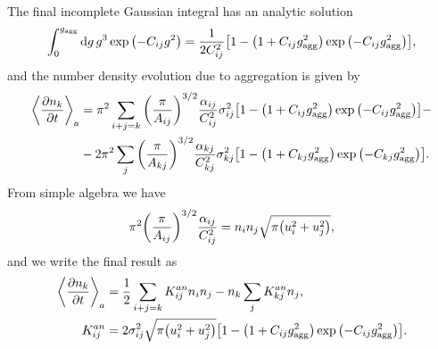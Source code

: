 \documentclass[aps,prl,preprint,groupedaddress,10pt]{revtex4-2}
\begin{document}
The final incomplete Gaussian integral has an analytic solution
\begin{equation}
    \int_{0}^{\ltx{g}{agg}}\dd{g}g^3\exp\pqty{-C_{ij}g^2}=
    \frac{1}{2C_{ij}^2}\bqty{1-\pqty{1+C_{ij}\ltx{g}{agg}^2}\exp\pqty{-C_{ij}\ltx{g}{agg}^2}},
\end{equation}
and the number density evolution due to aggregation is given by
\begin{equation}
    \begin{split}
        \avg{\pdv{n_k}{t}}_a&=\pi^2\sum_{i+j=k}\pqty{\frac{\pi}{A_{ij}}}^{3/2}
        \frac{\alpha_{ij}}{C_{ij}^2}\sigma_{ij}^2
        \bqty{1-\pqty{1+C_{ij}\ltx{g}{agg}^2}\exp\pqty{-C_{ij}\ltx{g}{agg}^2}}-\\
        &-2\pi^2\sum_{j}\pqty{\frac{\pi}{A_{kj}}}^{3/2}\frac{\alpha_{kj}}{C_{kj}^2}\sigma_{kj}^2
        \bqty{1-\pqty{1+C_{kj}\ltx{g}{agg}^2}\exp\pqty{-C_{kj}\ltx{g}{agg}^2}}.
    \end{split}
\end{equation}
From simple algebra we have
\begin{equation}
    \pi^2\pqty{\frac{\pi}{A_{ij}}}^{3/2}\frac{\alpha_{ij}}{C_{ij}^2}=n_in_j\sqrt{\pi\pqty{u_i^2+u_j^2}},
\end{equation}
and we write the final result as
\begin{equation}
    \begin{split}
        \avg{\pdv{n_k}{t}}_a&=\frac{1}{2}\sum_{i+j=k}K_{ij}^{an}n_in_j-n_k\sum_{j}K_{kj}^{an}n_j,\\
        K_{ij}^{an}&=2\sigma_{ij}^2\sqrt{\pi\pqty{u_i^2+u_j^2}}
        \bqty{1-\pqty{1+C_{ij}\ltx{g}{agg}^2}\exp\pqty{-C_{ij}\ltx{g}{agg}^2}}.
    \end{split}
\end{equation}
\end{document}

